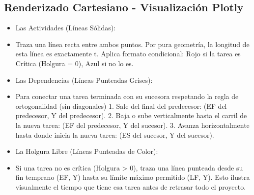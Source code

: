 \documentclass[10pt,a4paper]{article}
\begin{document}
\subsection{Renderizado Cartesiano - Visualización Plotly}

\begin{itemize}
    \item Las Actividades (Líneas Sólidas):
    \item Traza una línea recta entre ambos puntos. Por pura geometría, la longitud de esta línea es exactamente t.
    Aplica formato condicional: Rojo si la tarea es Crítica (Holgura = 0), Azul si no lo es.
    \item Las Dependencias (Líneas Punteadas Grises):
    \item Para conectar una tarea terminada con su sucesora respetando la regla de ortogonalidad (sin diagonales)
    1. Sale del final del predecesor: (EF del predecesor, Y del predecesor).
    2. Baja o sube verticalmente hasta el carril de la nueva tarea: (EF del predecesor, Y del sucesor).
    3. Avanza horizontalmente hasta donde inicia la nueva tarea: (ES del sucesor, Y del sucesor).
    \item La Holgura Libre (Líneas Punteadas de Color):
    \item Si una tarea no es crítica (Holgura > 0), 
    traza una línea punteada desde su fin temprano (EF, Y) hasta su límite máximo permitido (LF, Y). 
    Esto ilustra visualmente el tiempo que tiene esa tarea antes de retrasar todo el proyecto.
\end{itemize}
\end{document}
